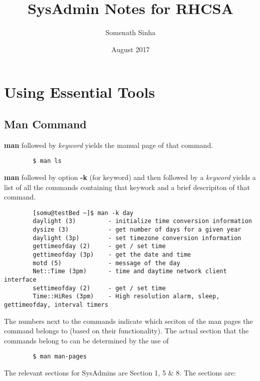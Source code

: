\documentclass{report}
\title{SysAdmin Notes for RHCSA}
\author{Somenath Sinha}
\date{August 2017}
\begin{document}
	\maketitle
	\newpage
	
	\chapter{Using Essential Tools}
	\section{Man Command}
	
	\textbf{man} followed by \textit{keyword} yields the manual page of that command. 
	\vspace{-20pt}
	\begin{verbatim}
		$ man ls
	\end{verbatim}
	
	\vspace{-15pt}
	\noindent
	\textbf{man} followed by option \textbf{-k} (for keyword) and then followed by a \textit{keyword} yields a list of all the commands containing that keywork and a brief descripiton of that command.
	\vspace{-20pt} 
	\begin{verbatim}
		[somu@testBed ~]$ man -k day
		daylight (3)         - initialize time conversion information
		dysize (3)           - get number of days for a given year
		daylight (3p)        - set timezone conversion information
		gettimeofday (2)     - get / set time
		gettimeofday (3p)    - get the date and time
		motd (5)             - message of the day
		Net::Time (3pm)      - time and daytime network client interface
		settimeofday (2)     - get / set time
		Time::HiRes (3pm)    - High resolution alarm, sleep, gettimeofday, interval timers
	\end{verbatim}
	
	\vspace{-15pt}
	\noindent
	The numbers next to the commands indicate which seciton of the man pages the command belongs to (based on their functionality). The actual section that the commands belong to can be determined by the use of 
	
	\vspace{-20pt}
	\begin{verbatim}
		$ man man-pages
	\end{verbatim}
	
	\vspace{-15pt}
	\noindent
	The relevant sections for SysAdmins are Section 1, 5 \& 8. The sections are:
	
\end{document}
